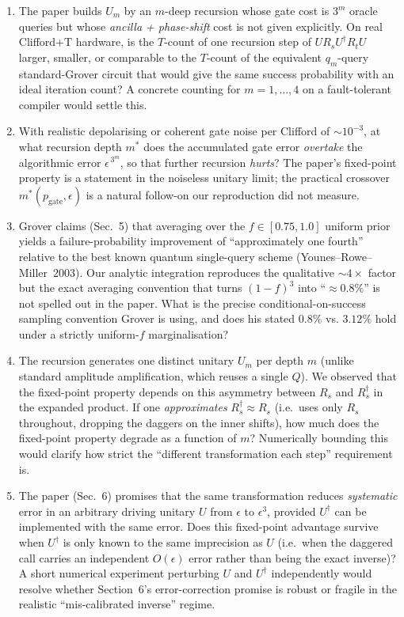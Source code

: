 \begin{enumerate}
  \item[\textbf{Q1.}] The paper builds $U_m$ by an $m$-deep recursion whose
    gate cost is $3^{m}$ oracle queries but whose \emph{ancilla + phase-shift}
    cost is not given explicitly. On real Clifford+T hardware, is the
    $T$-count of one recursion step of $U R_s U^\dagger R_t U$ larger,
    smaller, or comparable to the $T$-count of the equivalent
    $q_m$-query standard-Grover circuit that would give the same
    success probability with an ideal iteration count? A concrete
    counting for $m=1,\dots,4$ on a fault-tolerant compiler would
    settle this.
  \item[\textbf{Q2.}] With realistic depolarising or coherent gate
    noise per Clifford of $\sim 10^{-3}$, at what recursion depth $m^{*}$
    does the accumulated gate error \emph{overtake} the algorithmic
    error $\epsilon^{\,3^{m}}$, so that further recursion \emph{hurts}?
    The paper's fixed-point property is a statement in the noiseless
    unitary limit; the practical crossover $m^{*}(p_\text{gate},\epsilon)$
    is a natural follow-on our reproduction did not measure.
  \item[\textbf{Q3.}] Grover claims (Sec.~5) that averaging over the
    $f \in [0.75, 1.0]$ uniform prior yields a failure-probability
    improvement of ``approximately one fourth'' relative to the best
    known quantum single-query scheme (Younes--Rowe--Miller~2003). Our
    analytic integration reproduces the qualitative $\sim 4\times$
    factor but the exact averaging convention that turns $(1-f)^3$
    into ``$\approx 0.8\%$'' is not spelled out in the paper. What is
    the precise conditional-on-success sampling convention Grover is
    using, and does his stated $0.8\%$ vs. $3.12\%$ hold under a
    strictly uniform-$f$ marginalisation?
  \item[\textbf{Q4.}] The recursion generates one distinct unitary $U_m$
    per depth $m$ (unlike standard amplitude amplification, which
    reuses a single $Q$). We observed that the fixed-point property
    depends on this asymmetry between $R_s$ and $R_s^\dagger$ in the
    expanded product. If one \emph{approximates} $R_s^\dagger \approx R_s$
    (i.e.\ uses only $R_s$ throughout, dropping the daggers on the
    inner shifts), how much does the fixed-point property degrade as a
    function of $m$? Numerically bounding this would clarify how
    strict the ``different transformation each step'' requirement is.
  \item[\textbf{Q5.}] The paper (Sec.~6) promises that the same
    transformation reduces \emph{systematic} error in an arbitrary
    driving unitary $U$ from $\epsilon$ to $\epsilon^{3}$, provided
    $U^\dagger$ can be implemented with the same error. Does this
    fixed-point advantage survive when $U^\dagger$ is only known to
    the same imprecision as $U$ (i.e.\ when the daggered call carries
    an independent $O(\epsilon)$ error rather than being the exact
    inverse)? A short numerical experiment perturbing $U$ and
    $U^\dagger$ independently would resolve whether Section~6's
    error-correction promise is robust or fragile in the realistic
    ``mis-calibrated inverse'' regime.
\end{enumerate}
